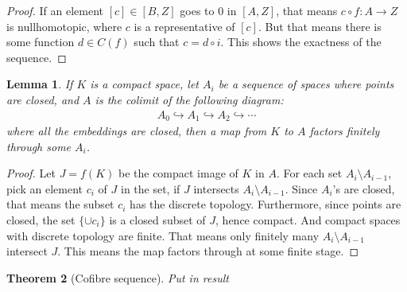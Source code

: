 \documentclass[12pt, notitlepage]{article}
\newtheorem{thm}{Theorem}[section]
\newtheorem{lem}[thm]{Lemma}
\theoremstyle{definition}
\begin{document}
\begin{proof}
  If an element $[c] \in [B,Z]$ goes to $0$ in $[A, Z]$, that means $c \circ f: A \to Z$ is
  nullhomotopic, where $c$ is a representative of $[c]$. But that means there is some function
  $d \in C(f)$ such that $c = d \circ i$. This shows the exactness of the sequence.
\end{proof}

\begin{lem}
  If $K$ is a compact space, let $A_i$ be a sequence of spaces where points are closed,
  and $A$ is the colimit of the following diagram:
  \begin{align*}
    A_0 \hookrightarrow A_1 \hookrightarrow A_2 \hookrightarrow \cdots
  \end{align*}
  where all the embeddings are closed, then a map from $K$ to $A$ factors finitely through some
  $A_i$.
\end{lem}

\begin{proof}
  Let $J = f(K)$ be the compact image of $K$ in $A$. For each set $A_i \setminus A_{i-1}$, pick
  an element $c_i$ of $J$ in the set, if $J$ intersects $A_i \setminus A_{i-1}$. Since $A_i$'s
  are closed, that means the subset $c_i$ has the discrete topology. Furthermore, since points are
  closed, the set $\{\cup c_i\}$ is a closed subset of $J$, hence compact. And compact spaces with
  discrete topology are finite. That means only finitely many $A_i \setminus A_{i-1}$ intersect $J$.
  This means the map factors through at some finite stage.
\end{proof}

\begin{thm}[Cofibre sequence]
  Put in result
\end{thm}

%  
\end{document}
